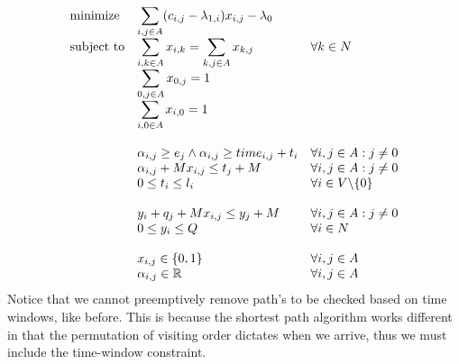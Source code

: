 \documentclass{article}
\begin{document}
    \begin{equation*}
        \begin{array}{ll@{}ll}
            \text{minimize}  & \displaystyle\sum_{i,j \in A} ( c_{i, j} - \lambda_{1,i})x_{i,j} - \lambda_0&&\\
            \text{subject to}& \displaystyle\sum_{i, k \in A}x_{i,k} = \sum_{k, j \in A}x_{k,j} &&\forall k \in N\\
            & \displaystyle\sum_{0,j \in A}x_{0,j} = 1 &&\\
            & \displaystyle\sum_{i,0 \in A}x_{i,0} = 1 &&\\\\
            & \displaystyle\alpha_{i,j} \geq e_j \land \alpha_{i,j} \geq time_{i,j} + t_i &&  \forall i,j \in A: j \neq 0\\
            & \displaystyle \alpha_{i,j} + Mx_{i,j} \leq t_j + M  && \forall i,j \in A: j \neq 0\\
            & \displaystyle0 \leq t_i \leq l_i &&  \forall i \in V \backslash \{ 0 \}\\\\
            & \displaystyle y_i + q_j + M x_{i,j} \leq y_j + M & & \forall i,j \in A : j \neq 0\\
            & \displaystyle 0 \leq y_i \leq Q && \forall i \in N \\\\
            & \displaystyle x_{i,j} \in \{0,1\} && \forall i,j \in A\\
            & \displaystyle \alpha_{i,j} \in \mathbb{R} && \forall i,j \in A
        \end{array}
    \end{equation*}
    Notice that we cannot preemptively remove path's to be checked based on time windows, like before.
    This is because the shortest path algorithm works different in that the permutation of visiting order dictates when we arrive, thus we must include the time-window constraint.
\end{document}
